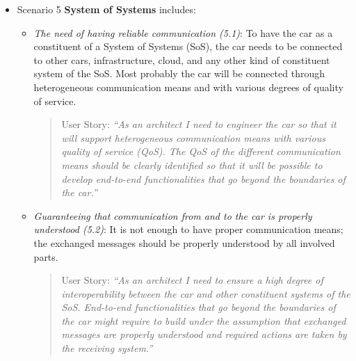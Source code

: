 \begin{itemize}
\begin{itemize}
\item {\em The need for establishing short feedback cycles (4.3)}: While developing new functionality, basic software, and hardware, one should plan on how to receive feedback, which data to collect, and how to use it in the development.

\begin{quote}
{User Story:} 
\emph{``As any developer of the electrical system (internal or external) I want to have quick feedback on how my contribution will work on the various levels of integration. 
As a Functional Developer, I want to have fast and defined feedback cycles. 
As a tester, I want quick updates on all levels of tests and continuous improvement of functionality.''}
\end{quote}
\end{itemize}



\item Scenario 5 {\bf System of Systems} includes:

\begin{itemize}
\item {\em The need of having reliable communication (5.1)}: To have the car as a constituent of a System of Systems (SoS), the car needs to be connected to other cars, infrastructure, cloud, and any other kind of constituent system of the SoS. Most probably the car will be connected through heterogeneous communication means and with various degrees of quality of service.

\begin{quote}
{User Story:} 
\emph{``As an architect I need to engineer the car so that it will support heterogeneous communication means with various quality of service (QoS). The QoS of the different communication means should be clearly identified so that it will be possible to develop end-to-end functionalities that go beyond the boundaries of the car.''}
\end{quote}

\item {\em Guaranteeing that communication from and to the car is properly understood (5.2)}: It is not enough to have proper communication means; the exchanged messages should be properly understood by all involved parts.

\begin{quote}
{User Story:} 
\emph{``As an architect I need to ensure a high degree of interoperability between the car and other constituent systems of the SoS. End-to-end functionalities that go beyond the boundaries of the car might require to build under the assumption that exchanged messages are properly understood and required actions are taken by the receiving system.''}
\end{quote}


\end{itemize}
\end{itemize}
